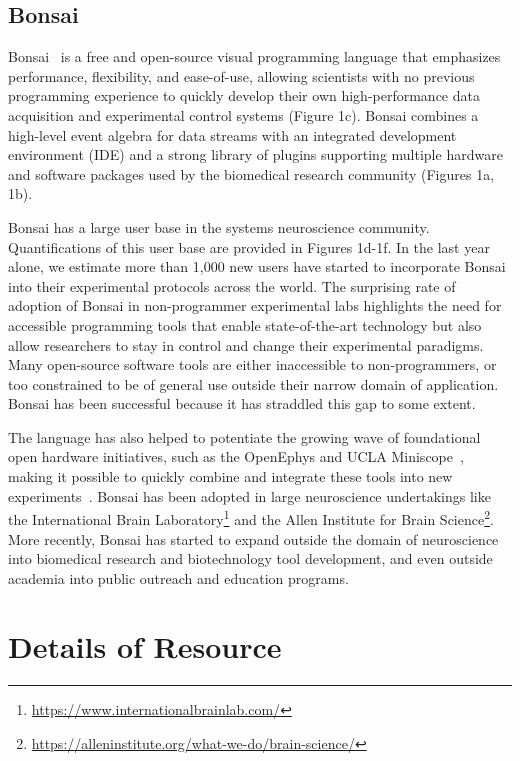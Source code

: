 \documentclass[a4paper,11point]{article}
\begin{document}
\subsection{Bonsai}
\label{sec:bonsai}

Bonsai~\citep{lopesEtAl15,lopesAndMonteiro21} is a free and open-source visual
programming language that emphasizes performance, flexibility, and ease-of-use,
allowing scientists with no previous programming experience to quickly develop
their own high-performance data acquisition and experimental control systems
(Figure 1c). Bonsai combines a high-level event algebra for data streams with
an integrated development environment (IDE) and a strong library of plugins
supporting multiple hardware and software packages used by the biomedical
research community (Figures 1a, 1b).

Bonsai has a large user base in the systems neuroscience community.
Quantifications of this user base are provided in Figures 1d-1f.  In the last
year alone, we estimate more than 1,000 new users have started to incorporate
Bonsai into their experimental protocols across the world. The surprising rate
of adoption of Bonsai in non-programmer experimental labs highlights the need
for accessible programming tools that enable state-of-the-art technology but
also allow researchers to stay in control and change their experimental
paradigms.  Many open-source software tools are either inaccessible to
non-programmers, or too constrained to be of general use outside their narrow
domain of application. Bonsai has been successful because it has straddled this
gap to some extent.

The language has also helped to potentiate the growing wave of foundational
open hardware initiatives, such as the OpenEphys \citep{siegleEtAl17} and UCLA
Miniscope~\citep{caiEtAl16}, making it possible to quickly combine and
integrate these tools into new experiments~\citep{buccinoEtAl18}.
%
Bonsai has been adopted in large neuroscience undertakings like the
International Brain
Laboratory\footnote{\href{https://www.internationalbrainlab.com/}{https://www.internationalbrainlab.com/}}
and the Allen Institute for Brain
Science\footnote{\href{https://alleninstitute.org/what-we-do/brain-science/}{https://alleninstitute.org/what-we-do/brain-science/}}.
%
More recently, Bonsai has started to expand outside the domain of neuroscience
into biomedical research and biotechnology tool development, and even outside
academia into public outreach and education programs.

\section{Details of Resource}
\end{document}
